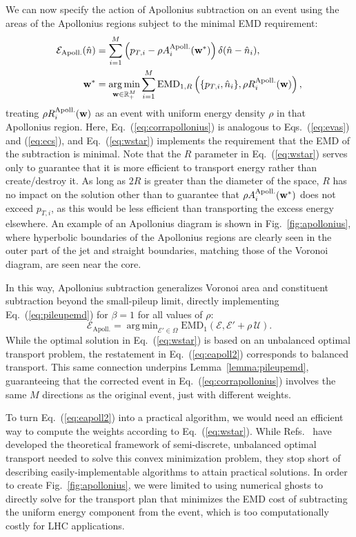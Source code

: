 \documentclass[letterpaper,11pt]{article}
\DeclareMathOperator*{\argmin}{arg\,min}
\newcommand{\E}{\mathcal{E}}
\DeclareRobustCommand{\Fig}[1]{Fig.~\ref{#1}}
\DeclareRobustCommand{\Eq}[1]{Eq.~(\ref{#1})}
\DeclareRobustCommand{\Eqs}[2]{Eqs.~(\ref{#1}) and (\ref{#2})}
\DeclareRobustCommand{\Refs}[1]{Refs.~\cite{#1}}
\newcommand{\EMD}{\text{EMD}\xspace}
\begin{document}
We can now specify the action of Apollonius subtraction on an event using the areas of the Apollonius regions subject to the minimal EMD requirement:
%
\begin{align}
\label{eq:corrapollonius}
\E_\text{Apoll.}(\hat n) &=\sum_{i=1}^M\left(p_{T,i} - \rho A_i^\text{Apoll.}({\bf w}^*)\right)\delta(\hat n-\hat n_i),
\\ \label{eq:wstar}
{\bf w}^* &=\argmin_{{\bf w}\in\mathbb{R}_+^M}\sum_{i=1}^M\EMD_{1,R}\left(\{p_{T,i},\hat n_i\},\rho R_i^\text{Apoll.}(\bf w)\right),
\end{align}
treating $\rho R_i^\text{Apoll.}({\bf w})$ as an event with uniform energy density $\rho$ in that Apollonius region.
%
Here, \Eq{eq:corrapollonius} is analogous to \Eqs{eq:evas}{eq:ecs}, and \Eq{eq:wstar} implements the requirement that the EMD of the subtraction is minimal.
%
Note that the $R$ parameter in \Eq{eq:wstar} serves only to guarantee that it is more efficient to transport energy rather than create/destroy it.
%
As long as $2R$ is greater than the diameter of the space, $R$ has no impact on the solution other than to guarantee that $\rho A_i^\text{Apoll.}({\bf w}^*)$ does not exceed $p_{T,i}$, as this would be less efficient than transporting the excess energy elsewhere.
%
An example of an Apollonius diagram is shown in \Fig{fig:apollonius}, where hyperbolic boundaries of the Apollonius regions are clearly seen in the outer part of the jet and straight boundaries, matching those of the Voronoi diagram, are seen near the core.


In this way, Apollonius subtraction generalizes Voronoi area and constituent subtraction beyond the small-pileup limit, directly implementing \Eq{eq:pileupemd} for $\beta=1$ for all values of $\rho$:
%
\begin{equation}\label{eq:eapoll2}
\boxed{
\mathcal E_\text{Apoll.} = \argmin_{\mathcal E' \in \Omega} \EMD_1(\mathcal E, \mathcal E' + \rho\,\mathcal U).
}
\end{equation}
%
While the optimal solution in \Eq{eq:wstar} is based on an unbalanced optimal transport problem, the restatement in \Eq{eq:eapoll2} corresponds to balanced transport.
%
This same connection underpins Lemma~\ref{lemma:pileupemd}, guaranteeing that the corrected event in \Eq{eq:corrapollonius} involves the same $M$ directions as the original event, just with different weights. 


To turn \Eq{eq:eapoll2} into a practical algorithm, we would need an efficient way to compute the weights according to \Eq{eq:wstar}.
%
While \Refs{OTtheory,bourne2018semi} have developed the theoretical framework of semi-discrete, unbalanced optimal transport needed to solve this convex minimization problem, they stop short of describing easily-implementable algorithms to attain practical solutions.
%
In order to create \Fig{fig:apollonius}, we were limited to using numerical ghosts to directly solve for the transport plan that minimizes the EMD cost of subtracting the uniform energy component from the event, which is too computationally costly for LHC applications.
\end{document}
